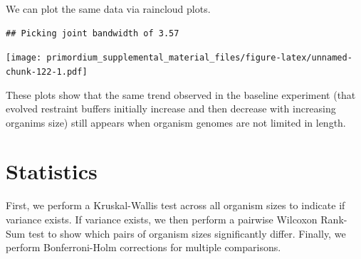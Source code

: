 \documentclass[]{book}
\newenvironment{Shaded}{\begin{snugshade}}{\end{snugshade}}
\newcommand{\DataTypeTok}[1]{\textcolor[rgb]{0.13,0.29,0.53}{#1}}
\newcommand{\DecValTok}[1]{\textcolor[rgb]{0.00,0.00,0.81}{#1}}
\newcommand{\FloatTok}[1]{\textcolor[rgb]{0.00,0.00,0.81}{#1}}
\newcommand{\KeywordTok}[1]{\textcolor[rgb]{0.13,0.29,0.53}{\textbf{#1}}}
\newcommand{\NormalTok}[1]{#1}
\newcommand{\OperatorTok}[1]{\textcolor[rgb]{0.81,0.36,0.00}{\textbf{#1}}}
\newcommand{\StringTok}[1]{\textcolor[rgb]{0.31,0.60,0.02}{#1}}
\begin{document}
We can plot the same data via raincloud plots.

\begin{verbatim}
## Picking joint bandwidth of 3.57
\end{verbatim}

\texttt{[image: primordium\_supplemental\_material\_files/figure-latex/unnamed-chunk-122-1.pdf]}

These plots show that the same trend observed in the baseline experiment (that evolved restraint buffers initially increase and then decrease with increasing organims size) still appears when organism genomes are not limited in length.

\hypertarget{statistics-7}{%
\section{Statistics}\label{statistics-7}}

First, we perform a Kruskal-Wallis test across all organism sizes to indicate if variance exists.
If variance exists, we then perform a pairwise Wilcoxon Rank-Sum test to show which pairs of organism sizes significantly differ.
Finally, we perform Bonferroni-Holm corrections for multiple comparisons.

\begin{Shaded}
\end{Shaded}
\end{document}
